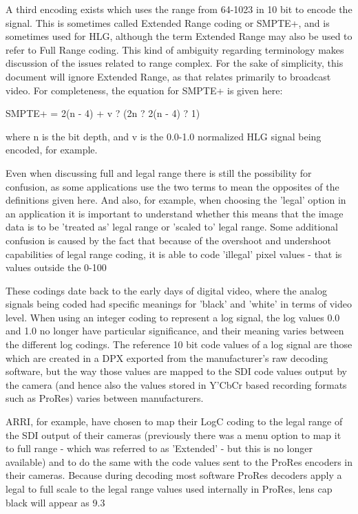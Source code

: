 A third encoding exists which uses the range from 64-1023 in 10 bit to encode the signal. This is sometimes called Extended Range coding or SMPTE+, and is sometimes used for HLG, although the term Extended Range may also be used to refer to Full Range coding. This kind of ambiguity regarding terminology makes discussion of the issues related to range complex. For the sake of simplicity, this document will ignore Extended Range, as that relates primarily to broadcast video. For completeness, the equation for SMPTE+ is given here:

	SMPTE+ = 2(n - 4) +  v ? (2n ? 2(n - 4) ? 1)

where n is the bit depth, and v is the 0.0-1.0 normalized HLG signal being encoded, for example.

Even when discussing full and legal range there is still the possibility for confusion, as some applications use the two terms to mean the opposites of the definitions given here. And also, for example, when choosing the 'legal' option in an application it is important to understand whether this means that the image data is to be 'treated as' legal range or 'scaled to' legal range. Some additional confusion is caused by the fact that because of the overshoot and undershoot capabilities of legal range coding, it is able to code 'illegal' pixel values - that is values outside the 0-100%

These codings date back to the early days of digital video, where the analog signals being coded had specific meanings for 'black' and 'white' in terms of video level. When using an integer coding to represent a log signal, the log values 0.0 and 1.0 no longer have particular significance, and their meaning varies between the different log codings. The reference 10 bit code values of a log signal are those which are created in a DPX exported from the manufacturer's raw decoding software, but the way those values are mapped to the SDI code values output by the camera (and hence also the values stored in Y'CbCr based recording formats such as ProRes) varies between manufacturers.

ARRI, for example, have chosen to map their LogC coding to the legal range of the SDI output of their cameras (previously there was a menu option to map it to full range - which was referred to as 'Extended' - but this is no longer available) and to do the same with the code values sent to the ProRes encoders in their cameras. Because during decoding most software ProRes decoders apply a legal to full scale to the legal range values used internally in ProRes, lens cap black will appear as 9.3%



